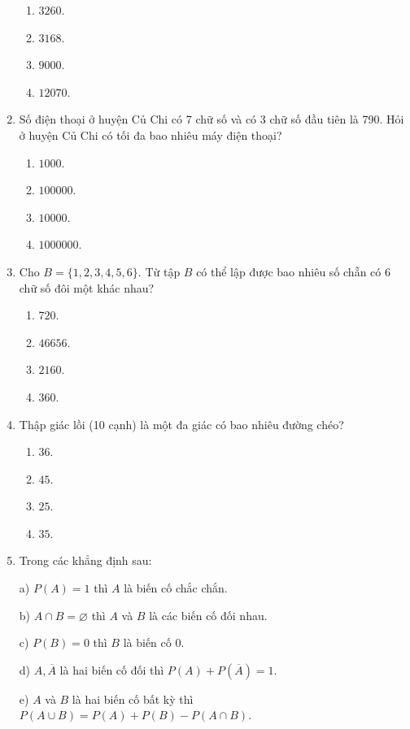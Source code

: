 \begin{enumerate}[label=\textbf{Câu \arabic*.},align=left,left=0cm..0cm,itemindent=*]
	\begin{enumerate}[label=\textbf{\Alph*.},align=left,left=1cm..0cm,itemindent=*]
		\item $3260$. \item $3168$. \item $9000$. \item $12070$.
	\end{enumerate}
	\item Số điện thoại ở huyện Củ Chi có 7 chữ số và có 3 chữ số đầu tiên là 790. Hỏi ở huyện Củ Chi có tối đa bao nhiêu máy điện thoại?
	\begin{enumerate}[label=\textbf{\Alph*.},align=left,left=1cm..0cm,itemindent=*]
		\item $1000$. \item $100000$. \item $10000$. \item $1000000$.
	\end{enumerate}
	\item Cho $B=\{1,2,3,4,5,6\}$. Từ tập $B$ có thể lập được bao nhiêu số chẵn có 6 chữ số đôi một khác nhau?
	\begin{enumerate}[label=\textbf{\Alph*.},align=left,left=1cm..0cm,itemindent=*]
		\item $720$. \item $46656$. \item $2160$. \item $360$.
	\end{enumerate}
	\item Thập giác lồi (10 cạnh) là một đa giác có bao nhiêu đường chéo?
	\begin{enumerate}[label=\textbf{\Alph*.},align=left,left=1cm..0cm,itemindent=*]
		\item $36$. \item $45$. \item $25$. \item $35$.
	\end{enumerate}
	\item Trong các khẳng định sau:\par
	a) $P(A)=1$ thì $A$ là biến cố chắc chắn.\par
	b) $A\cap B=\varnothing$ thì $A$ và $B$ là các biến cố đối nhau.\par
	c) $P(B)=0$ thì $B$ là biến cố 0.\par
	d) $A,\overline{A}$ là hai biến cố đối thì $P(A)+P\left(\overline{A}\right)=1$.\par
	e) $A$ và $B$ là hai biến cố bất kỳ thì $P (A\cup B)=P(A)+P(B)-P (A\cap B)$.\par

\end{enumerate}
